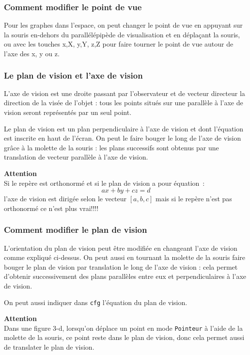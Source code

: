 \documentclass[a4paper,11pt]{article}
\begin{document}
\subsubsection{Comment modifier le point de vue}
Pour les graphes dans l'espace, on peut changer le point de vue en
appuyant sur la souris en-dehors du parall\'el\'epip\`ede de visualisation
et en d\'epla\c{c}ant la souris, ou avec les touches x,X, y,Y, z,Z pour
faire tourner le point de vue autour de l'axe des x, y ou z. 

\subsubsection{Le plan de vision et l'axe de vision}
L'axe de vision est une droite passant par l'observateur et de vecteur 
directeur la direction de la vis\'ee de l'objet : tous les points situ\'es sur 
une parall\`ele \`a l'axe de vision seront repr\'esent\'es par un seul point.

Le plan de vision est un plan perpendiculaire \`a l'axe de vision et dont 
l'\'equation est inscrite en haut de l'\'ecran. On peut le 
faire bouger le long de l'axe de vision gr\^ace \`a la molette de la souris :
les plans successifs sont obtenus par une translation de vecteur
parall\`ele \`a l'axe de vision.

{\bf Attention}\\
Si le rep\`ere est orthonorm\'e et si le plan de vision a pour \'equation~:
\[ ax+by+cz=d \] 
l'axe de vision est dirig\'ee selon le vecteur $[a,b,c]$ mais
si le rep\`ere n'est pas orthonorm\'e ce n'est plus vrai!!!!

\subsubsection{Comment modifier le plan de vision}
L'orientation du plan de vision peut \^etre modifi\'ee en changeant l'axe de 
vision comme expliqu\'e ci-dessus. On
peut aussi en tournant la molette de la souris
faire bouger le plan de vision par translation le 
long de l'axe de vision : cela permet d'obtenir successivement des plans 
parall\`eles entre eux et perpendiculaires \`a l'axe de vision.

On peut aussi indiquer dans \verb|cfg| l'\'equation du plan
de vision.

{\bf Attention}\\
Dans une figure 3-d, lorsqu'on d\'eplace un point en mode 
{\tt Pointeur} \`a l'aide de la molette de 
la souris, ce point reste dans le plan de vision, donc cela permet aussi de
translater le plan de vision.
\end{document}

